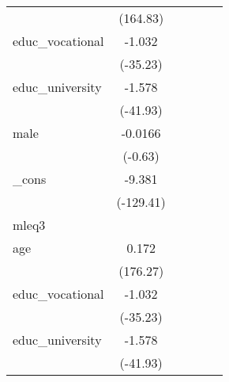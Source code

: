 {\begin{tabular}{l*{5}{c}}
            &    (164.83)         &                     &                     &                     &                     \\
[1em]
educ\_vocational&      -1.032\sym{***}&                     &                     &                     &                     \\
            &    (-35.23)         &                     &                     &                     &                     \\
[1em]
educ\_university&      -1.578\sym{***}&                     &                     &                     &                     \\
            &    (-41.93)         &                     &                     &                     &                     \\
[1em]
male        &     -0.0166         &                     &                     &                     &                     \\
            &     (-0.63)         &                     &                     &                     &                     \\
[1em]
\_cons      &      -9.381\sym{***}&                     &                     &                     &                     \\
            &   (-129.41)         &                     &                     &                     &                     \\
\hline
mleq3       &                     &                     &                     &                     &                     \\
age         &       0.172\sym{***}&                     &                     &                     &                     \\
            &    (176.27)         &                     &                     &                     &                     \\
[1em]
educ\_vocational&      -1.032\sym{***}&                     &                     &                     &                     \\
            &    (-35.23)         &                     &                     &                     &                     \\
[1em]
educ\_university&      -1.578\sym{***}&                     &                     &                     &                     \\
            &    (-41.93)         &                     &                     &                     &                     \\

\end{tabular}}
